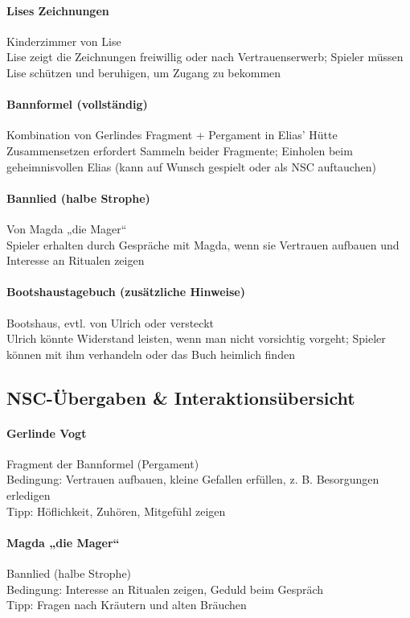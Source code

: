 \paragraph{Lises Zeichnungen}
Kinderzimmer von Lise\\
Lise zeigt die Zeichnungen freiwillig oder nach Vertrauenserwerb; Spieler müssen Lise schützen und beruhigen, um Zugang zu bekommen
\paragraph{Bannformel (vollständig)}
Kombination von Gerlindes Fragment + Pergament in Elias’ Hütte\\
Zusammensetzen erfordert Sammeln beider Fragmente; Einholen beim geheimnisvollen Elias (kann auf Wunsch gespielt oder als NSC auftauchen)
\paragraph{Bannlied (halbe Strophe)}
Von Magda „die Mager“\\
Spieler erhalten durch Gespräche mit Magda, wenn sie Vertrauen aufbauen und Interesse an Ritualen zeigen
\paragraph{Bootshaustagebuch (zusätzliche Hinweise)}
Bootshaus, evtl. von Ulrich oder versteckt\\
Ulrich könnte Widerstand leisten, wenn man nicht vorsichtig vorgeht; Spieler können mit ihm verhandeln oder das Buch heimlich finden
\newpage
\subsection{NSC-Übergaben \& Interaktionsübersicht}
\paragraph{Gerlinde Vogt}
Fragment der Bannformel (Pergament)\\
Bedingung: 
Vertrauen aufbauen, kleine Gefallen erfüllen, z. B. Besorgungen erledigen\\
Tipp: 
Höflichkeit, Zuhören, Mitgefühl zeigen
\paragraph{Magda „die Mager“}
Bannlied (halbe Strophe)\\
Bedingung: 
Interesse an Ritualen zeigen, Geduld beim Gespräch\\
Tipp: 
Fragen nach Kräutern und alten Bräuchen
